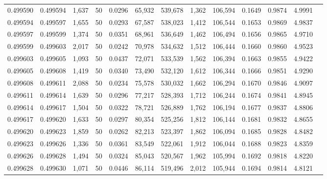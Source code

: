 \begin{tabular}{rrrrrrrrrrrrr}
0.499590 & 0.499594 & 1,637 &  50 &                                     0.0296 &  65,932 & 539,678 &   1,362 & 106,594 & 0.1649 & 0.9874 & 4.9991 \\
0.499594 & 0.499597 & 1,655 &  50 &                                     0.0293 &  67,587 & 538,023 &   1,412 & 106,544 & 0.1653 & 0.9869 & 4.9837 \\
0.499597 & 0.499599 & 1,374 &  50 &                                     0.0351 &  68,961 & 536,649 &   1,462 & 106,494 & 0.1656 & 0.9865 & 4.9710 \\
0.499599 & 0.499603 & 2,017 &  50 &                                     0.0242 &  70,978 & 534,632 &   1,512 & 106,444 & 0.1660 & 0.9860 & 4.9523 \\
0.499603 & 0.499605 & 1,093 &  50 &                                     0.0437 &  72,071 & 533,539 &   1,562 & 106,394 & 0.1663 & 0.9855 & 4.9422 \\
0.499605 & 0.499608 & 1,419 &  50 &                                     0.0340 &  73,490 & 532,120 &   1,612 & 106,344 & 0.1666 & 0.9851 & 4.9290 \\
0.499608 & 0.499611 & 2,088 &  50 &                                     0.0234 &  75,578 & 530,032 &   1,662 & 106,294 & 0.1670 & 0.9846 & 4.9097 \\
0.499611 & 0.499614 & 1,639 &  50 &                                     0.0296 &  77,217 & 528,393 &   1,712 & 106,244 & 0.1674 & 0.9841 & 4.8945 \\
0.499614 & 0.499617 & 1,504 &  50 &                                     0.0322 &  78,721 & 526,889 &   1,762 & 106,194 & 0.1677 & 0.9837 & 4.8806 \\
0.499617 & 0.499620 & 1,633 &  50 &                                     0.0297 &  80,354 & 525,256 &   1,812 & 106,144 & 0.1681 & 0.9832 & 4.8655 \\
0.499620 & 0.499623 & 1,859 &  50 &                                     0.0262 &  82,213 & 523,397 &   1,862 & 106,094 & 0.1685 & 0.9828 & 4.8482 \\
0.499623 & 0.499626 & 1,336 &  50 &                                     0.0361 &  83,549 & 522,061 &   1,912 & 106,044 & 0.1688 & 0.9823 & 4.8359 \\
0.499626 & 0.499628 & 1,494 &  50 &                                     0.0324 &  85,043 & 520,567 &   1,962 & 105,994 & 0.1692 & 0.9818 & 4.8220 \\
0.499628 & 0.499630 & 1,071 &  50 &                                     0.0446 &  86,114 & 519,496 &   2,012 & 105,944 & 0.1694 & 0.9814 & 4.8121 \\

\end{tabular}
